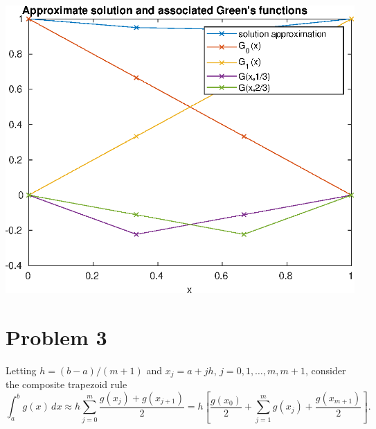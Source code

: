 \documentclass{article}
\begin{document}
\begin{center}
\includegraphics[scale=0.8]{hw2p2.eps}
\end{center}

\section{Problem 3}
Letting
$h = (b-a)/(m+1)$ and $x_j = a + jh$, $j = 0,1, \ldots , m, m+1$, consider the composite trapezoid rule
\[
\int_a^b g(x)\,dx \approx  h \sum_{j=0}^m \frac{g( x_j )+g( x_{j+1} )}{2} 
     =  h \left[ \frac{g( x_0 )}{2} + \sum_{j=1}^m g( x_j ) + 
                   \frac{g( x_{m+1} )}{2} \right] .
\]
\end{document}
